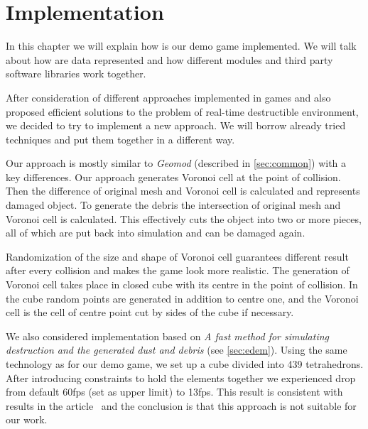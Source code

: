 \chapter{Implementation}
In this chapter we will explain how is our demo game implemented. We will talk about how are data represented and how different modules and third party software libraries work together.

After consideration of different approaches implemented in games and also proposed efficient solutions to the problem of real-time destructible environment, we decided to try to implement a new approach. We will borrow already tried techniques and put them together in a different way.

Our approach is mostly similar to \emph{Geomod} (described in \cref{sec:common}) with a key differences. Our approach generates Voronoi cell at the point of collision. Then the difference of original mesh and Voronoi cell is calculated and represents damaged object. To generate the debris the intersection of original mesh and Voronoi cell is calculated. This effectively cuts the object into two or more pieces, all of which are put back into simulation and can be damaged again.

Randomization of the size and shape of Voronoi cell guarantees different result after every collision and makes the game look more realistic. The generation of Voronoi cell takes place in closed cube with its centre in the point of collision. In the cube random points are generated in addition to centre one, and the Voronoi cell is the cell of centre point cut by sides of the cube if necessary.

We also considered implementation based on \emph{A fast method for simulating destruction and the generated dust and debris} (see \cref{sec:edem}). Using the same technology as for our demo game, we set up a cube divided into 439 tetrahedrons. After introducing constraints to hold the elements together we experienced drop from default 60fps (set as upper limit) to 13fps. This result is consistent with results in the article~\cite{edem} and the conclusion is that this approach is not suitable for our work.

